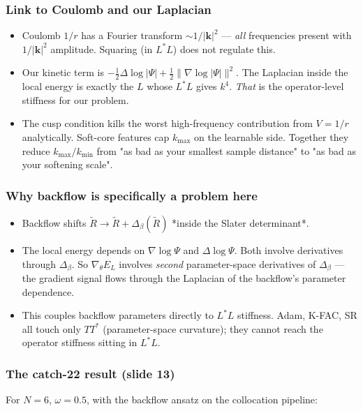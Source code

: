 \documentclass[11pt]{article}
\begin{document}
\subsubsection*{Link to Coulomb and our Laplacian}

\begin{itemize}
\item Coulomb $1/r$ has a Fourier transform $\sim 1/|\mathbf k|^2$ --- \emph{all}
frequencies present with $1/|\mathbf k|^2$ amplitude. Squaring (in $L^*
  L$) does not regulate this.
\item Our kinetic term is $-\frac12 \Delta \log |\Psi| + \frac12 \|\nabla
  \log|\Psi|\|^2$. The Laplacian inside the local energy is exactly the
$L$ whose $L^* L$ gives $k^4$. \emph{That} is the operator-level stiffness
for our problem.
\item The cusp condition kills the worst high-frequency contribution from $V =
  1/r$ analytically. Soft-core features cap $k_{\max}$ on the learnable
side. Together they reduce $k_{\max}/k_{\min}$ from "as bad as your
smallest sample distance" to "as bad as your softening scale".
\end{itemize}
\subsubsection*{Why backflow is specifically a problem here}

\begin{itemize}
\item Backflow shifts $\tilde R \to \tilde R + \Delta_\beta(\tilde R)$ *inside
the Slater determinant*.
\item The local energy depends on $\nabla \log \Psi$ and $\Delta \log \Psi$.
Both involve derivatives through $\Delta_\beta$. So
$\nabla_\theta E_L$ involves \emph{second} parameter-space derivatives of
$\Delta_\beta$ --- the gradient signal flows through the Laplacian of the
backflow's parameter dependence.
\item This couples backflow parameters directly to $L^* L$ stiffness. Adam,
K-FAC, SR all touch only $T T^*$ (parameter-space curvature); they
cannot reach the operator stiffness sitting in $L^* L$.
\end{itemize}
\subsubsection*{The catch-22 result (slide 13)}

For $N = 6$, $\omega = 0.5$, with the backflow ansatz on the collocation
pipeline:
\end{document}
